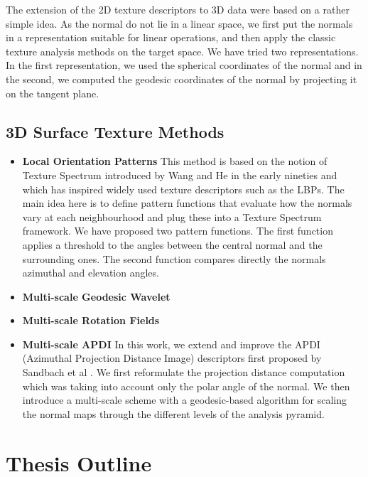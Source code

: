 The extension of the 2D texture descriptors to 3D data were based on a rather simple idea. As the normal do not lie in a linear space, we first put the normals in a representation suitable for linear operations, and then apply the classic texture analysis methods on the target space. We have tried two representations. In the first representation, we used the spherical coordinates of the normal and in the second, we computed the geodesic coordinates of the normal by projecting it on the tangent plane.


\subsection{3D Surface Texture Methods}
\begin{itemize}
\item \textbf{Local Orientation Patterns} This method is based on the notion of Texture Spectrum introduced by Wang and He \cite{WH.1990} in the early nineties and which has inspired widely used texture descriptors such as the LBPs. The main idea here is to define pattern functions that evaluate how the normals vary at each neighbourhood and plug these into a Texture Spectrum framework. We have proposed two pattern functions. The first function applies a threshold to the angles between the central normal and the surrounding ones. The second function compares directly the normals azimuthal and elevation angles.


\item \textbf{Multi-scale Geodesic Wavelet}
\item \textbf{Multi-scale Rotation Fields}

\item \textbf{Multi-scale APDI} In this work, we extend and improve the APDI (Azimuthal Projection Distance Image) descriptors first proposed by Sandbach et al \cite{SZ.2010}. We first reformulate the projection distance computation which was taking into account only the polar angle of the normal. We then introduce a multi-scale scheme with a geodesic-based algorithm for scaling the normal maps through the different levels of the analysis pyramid.
\end{itemize}

%
%


\section{Thesis Outline}
